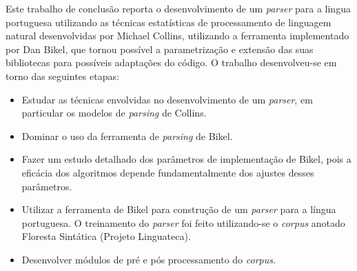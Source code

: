 Este trabalho de conclusão reporta o desenvolvimento de um \emph{parser} para a lingua portuguesa utilizando as técnicas estatísticas de processamento de linguagem natural desenvolvidas por Michael Collins, utilizando a ferramenta implementado por Dan Bikel, que tornou possível a parametrização e extensão das suas bibliotecas para possíveis adaptações do código. O trabalho desenvolveu-se em torno das seguintes etapas:

\begin{itemize}
	\item Estudar as técnicas envolvidas no desenvolvimento de um \emph{parser}, em particular os modelos de \emph{parsing} de Collins.
	\item Dominar o uso da ferramenta de \emph{parsing} de Bikel.
	\item Fazer um estudo detalhado dos parâmetros de implementação de Bikel, pois a eficácia dos algoritmos depende fundamentalmente dos ajustes desses parâmetros.
	\item Utilizar a ferramenta de Bikel para construção de um \emph{parser} para a língua portuguesa. O treinamento do \emph{parser} foi feito utilizando-se o \emph{corpus} anotado Floresta Sintática (Projeto Linguateca).
	\item Desenvolver módulos de pré e pós processamento do \emph{corpus}.
\end{itemize}

